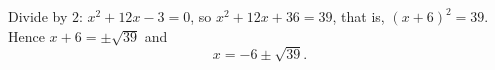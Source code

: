 Divide by $2$: $x^2+12x-3=0$, so $x^2+12x+36=39$, that is, $(x+6)^2=39$. Hence $x+6=\pm\sqrt{39}$ and
\[x=\boxed{-6\pm\sqrt{39}}.\]
